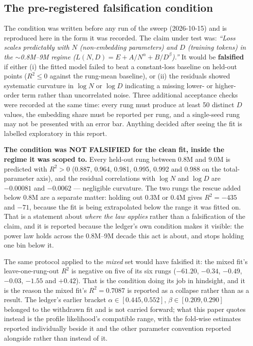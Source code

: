 \documentclass[11pt,a4paper]{article}
\begin{document}
\subsection{The pre-registered falsification condition}
\label{sec:act4-falsification}

The condition was written before any run of the sweep (2026-10-15) and is
reproduced here in the form it was recorded. The claim under test was: \emph{``Loss
scales predictably with $N$ (non-embedding parameters) and $D$ (training
tokens) in the $\sim$0.8M--9M regime ($L(N,D) = E + A/N^\alpha + B/D^\beta$).''}
It would be \textbf{falsified} if either (i) the fitted model failed to beat a
constant-loss baseline on held-out points ($R^2 \leq 0$ against the rung-mean
baseline), or (ii) the residuals showed systematic curvature in $\log N$ or
$\log D$ indicating a missing lower- or higher-order term rather than
uncorrelated noise. Three additional acceptance checks were recorded at the
same time: every rung must produce at least 50 distinct $D$ values, the
embedding share must be reported per rung, and a single-seed rung may not be
presented with an error bar. Anything decided after seeing the fit is
labelled exploratory in this report.

\textbf{The condition was NOT FALSIFIED for the clean fit, inside the regime it
was scoped to.} Every held-out rung between 0.8M and 9.0M is predicted with
$R^2 > 0$ (0.887, 0.964, 0.981, 0.995, 0.992 and 0.988 on the total-parameter
axis), and the residual correlations with $\log N$ and $\log D$ are $-0.00081$
and $-0.0062$ --- negligible curvature. The two rungs the rescue added below
0.8M are a separate matter: holding out 0.3M or 0.4M gives $R^2 = -435$ and
$-71$, because the fit is being extrapolated below the range it was fitted on.
That is a statement about \emph{where the law applies} rather than a
falsification of the claim, and it is reported because the ledger's own
condition makes it visible: the power law holds across the 0.8M--9M decade this
act is about, and stops holding one bin below it. %

The same protocol applied to the \emph{mixed} set would have falsified it:
the mixed fit's leave-one-rung-out $R^2$ is negative on five of its six rungs
($-61.20$, $-0.34$, $-0.49$, $-0.03$, $-1.55$ and $+0.42$). That is the
condition doing its job in hindsight, and it is the reason the mixed fit's
$R^2 = 0.7087$ is reported as a collapse rather than as a result. The
ledger's earlier bracket $\alpha \in [0.445, 0.552]$, $\beta \in [0.209,
0.290]$ belonged to the withdrawn fit and is not carried forward; what this
paper quotes instead is the profile likelihood's compatible range, with the
fold-wise estimates reported individually beside it and the other parameter
convention reported alongside rather than instead of it. %
\end{document}
